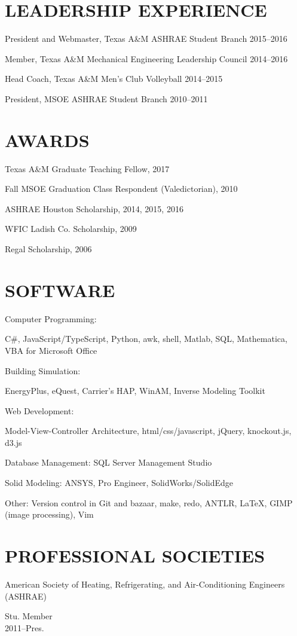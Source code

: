 \documentclass[margin]{res} %
\begin{document}
\begin{resume}
\section{LEADERSHIP EXPERIENCE}

President and Webmaster, Texas A\&M ASHRAE Student Branch \hfill 2015--2016

Member, Texas A\&M Mechanical Engineering Leadership Council \hfill 2014--2016

Head Coach, Texas A\&M Men's Club Volleyball \hfill 2014--2015\

President, MSOE ASHRAE Student Branch \hfill 2010--2011

\section{AWARDS}
Texas A\&M Graduate Teaching Fellow, 2017

Fall MSOE Graduation Class Respondent (Valedictorian), 2010

ASHRAE Houston Scholarship, 2014, 2015, 2016

WFIC Ladish Co. Scholarship, 2009

Regal Scholarship, 2006

\section{SOFTWARE}

Computer Programming: \parbox[t]{9cm}{C\#, JavaScript/TypeScript, Python, awk, shell, Matlab, SQL, Mathematica, VBA for Microsoft Office}

Building Simulation: \parbox[t]{10cm}{EnergyPlus, eQuest, Carrier's
HAP, WinAM, Inverse Modeling Toolkit }

Web Development: \parbox[t]{10cm}{Model-View-Controller Architecture,
html/css/javascript, jQuery, knockout.js, d3.js}

Database Management: SQL Server Management Studio

Solid Modeling: ANSYS, Pro Engineer, SolidWorks/SolidEdge

Other: Version control in Git and bazaar, make, redo, ANTLR, \LaTeX, GIMP (image processing), Vim

\section{PROFESSIONAL SOCIETIES}

\parbox[t]{9cm}{American Society of Heating, Refrigerating, and Air-Conditioning Engineers (ASHRAE)} \hfill \parbox[t]{3cm}{\raggedleft Stu. Member \\ 2011--Pres.}


\end{resume}
\end{document}

